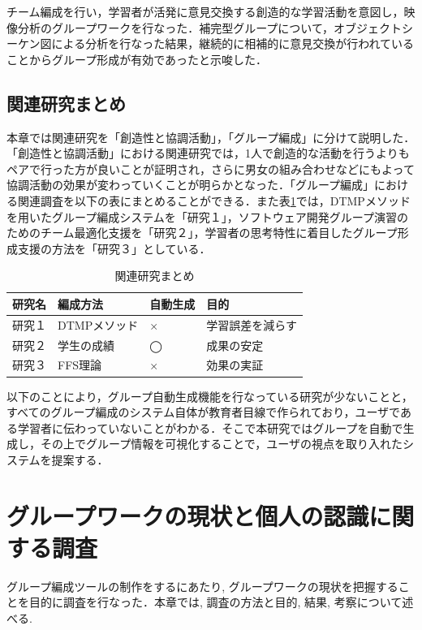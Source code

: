 \documentclass{funthesis}
\begin{document}
チーム編成を行い，学習者が活発に意見交換する創造的な学習活動を意図し，映像分析のグループワークを行なった．補完型グループについて，オブジェクトシーケン図による分析を行なった結果，継続的に相補的に意見交換が行われていることからグループ形成が有効であったと示唆した．



\section{関連研究まとめ}
本章では関連研究を「創造性と協調活動」，「グループ編成」に分けて説明した．「創造性と協調活動」における関連研究では，1人で創造的な活動を行うよりもペアで行った方が良いことが証明され，さらに男女の組み合わせなどにもよって協調活動の効果が変わっていくことが明らかとなった．「グループ編成」における関連調査を以下の表にまとめることができる．また表\ref{関連まとめ}では，DTMPメソッドを用いたグループ編成システムを「研究１」，ソフトウェア開発グループ演習のためのチーム最適化支援を「研究２」，学習者の思考特性に着目したグループ形成支援の方法を「研究３」としている．
\begin{table}[h]
\begin{center}
  \caption{関連研究まとめ}
  
  \begin{tabular}{llll} \hline
    研究名 & 編成方法 & 自動生成 & 目的\tabularnewline \hline
    研究１& DTMPメソッド & × & 学習誤差を減らす\tabularnewline
    研究２&学生の成績 &◯&成果の安定\tabularnewline
    研究３&FFS理論&× & 効果の実証\tabularnewline
     \hline
  \end{tabular}
  \label{関連まとめ}
  \end{center}
\end{table}



以下のことにより，グループ自動生成機能を行なっている研究が少ないことと，すべてのグループ編成のシステム自体が教育者目線で作られており，ユーザである学習者に伝わっていないことがわかる．そこで本研究ではグループを自動で生成し，その上でグループ情報を可視化することで，ユーザの視点を取り入れたシステムを提案する．
\chapter{グループワークの現状と個人の認識に関する調査}

グループ編成ツールの制作をするにあたり,  グループワークの現状を把握することを目的に調査を行なった．本章では,  調査の方法と目的,  結果,  考察について述べる.
\end{document}
